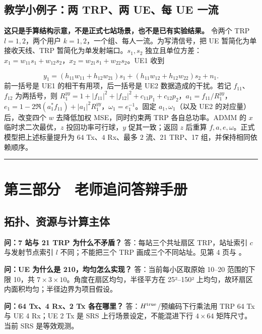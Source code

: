 \documentclass[11pt,a4paper]{ctexart}
\begin{document}
\subsection*{教学小例子：两 TRP、两 UE、每 UE 一流}

\textbf{这只是手算结构示意，不是正式七站场景，也不是已有实验结果。} 令两个 TRP $l=1,2$，两个用户 $k=1,2$，一个组、每人一流。为写清信号，把 UE 暂简化为单接收天线、TRP 暂简化为单发射端口。$s_1,s_2$ 独立且单位方差：$x_1=w_{11}s_1+w_{12}s_2$，$x_2=w_{21}s_1+w_{22}s_2$。UE1 收到\par
\[
y_1=(h_{11}w_{11}+h_{12}w_{21})s_1+(h_{11}w_{12}+h_{12}w_{22})s_2+n_1.
\]
前一括号是 UE1 的相干有用项，后一括号是 UE2 数据造成的干扰。若记 $f_{11}$、$f_{12}$ 为两括号，则 $R^{yy}_1=1+|f_{11}|^2+|f_{12}|^2+c_{11}p_1+c_{12}p_2$，$a_1=f_{11}/R^{yy}_1$，$e_1=1-2\Re(a_1^*f_{11})+|a_1|^2R^{yy}_1$，$\omega_1=e_1^{-1}$。固定 $a_1,\omega_1$（以及 UE2 的对应量）后，改变四个 $w$ 去降低加权 MSE，同时约束两 TRP 各自总功率。ADMM 的 $x$ 临时求二次最优，$z$ 投回功率可行球，$y$ 促其一致；返回 $z$ 后重算 $f,a,e,\omega$。正式模型把上述标量提升为 $64$ Tx、$4$ Rx、最多 $2$ 流、21 TRP、17 组，并保持相同依赖顺序。\par

\par\medskip\hrule\medskip

\clearpage\section*{第三部分　老师追问答辩手册}

\subsection*{拓扑、资源与计算主体}

\textbf{问：7 站与 21 TRP 为什么不矛盾？} 答：每站三个共址扇区 TRP，站址索引 $c$ 与发射节点索引 $l$ 不同；不能把三个 TRP 画成三个不同站址。见第 4 页与 。\par

\textbf{问：UE 为什么是 210，均匀怎么实现？} 答：当前每小区取原始 10–20 范围的下限 10，共 $7\times3\times10$。角度在扇区均匀，半径平方在 25²–150² 上均匀，故环扇区内面积均匀；半径边界为项目假设。\par

\textbf{问：64 Tx、4 Rx、2 Tx 各在哪里？} 答：$H^{\rm true}$/预编码下行乘法用 TRP 64 Tx 与 UE 4 Rx；UE 2 Tx 是 SRS 上行场景设定，不能混进下行 $4\times64$ 矩阵尺寸。当前 SRS 是等效观测。\par
\end{document}
